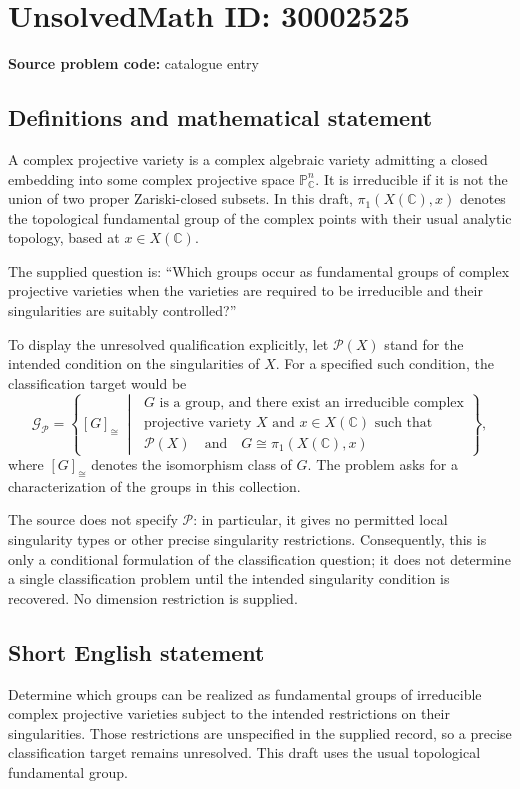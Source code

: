 \documentclass[11pt]{article}
\newcommand{\C}{\mathbb{C}}
\newcommand{\PP}{\mathbb{P}}
\begin{document}
\section*{UnsolvedMath ID: 30002525}
\textbf{Source problem code:} catalogue entry
\subsection{Definitions and mathematical statement}
A complex projective variety is a complex algebraic variety admitting a closed embedding into some complex projective space $\PP^n_{\C}$. It is irreducible if it is not the union of two proper Zariski-closed subsets. In this draft, $\pi_1(X(\C),x)$ denotes the topological fundamental group of the complex points with their usual analytic topology, based at $x\in X(\C)$.

The supplied question is: ``Which groups occur as fundamental groups of complex projective varieties when the varieties are required to be irreducible and their singularities are suitably controlled?''

To display the unresolved qualification explicitly, let $\mathcal P(X)$ stand for the intended condition on the singularities of $X$. For a specified such condition, the classification target would be
\[
\mathcal G_{\mathcal P}
=
\left\{[G]_{\cong}\;\middle|\;
\begin{gathered}
G\text{ is a group, and there exist an irreducible complex}\\
\text{projective variety }X\text{ and }x\in X(\C)\text{ such that}\\
\mathcal P(X)\quad\text{and}\quad G\cong\pi_1(X(\C),x)
\end{gathered}
\right\},
\]
where $[G]_{\cong}$ denotes the isomorphism class of $G$. The problem asks for a characterization of the groups in this collection.

The source does not specify $\mathcal P$: in particular, it gives no permitted local singularity types or other precise singularity restrictions. Consequently, this is only a conditional formulation of the classification question; it does not determine a single classification problem until the intended singularity condition is recovered. No dimension restriction is supplied.
\subsection{Short English statement}
Determine which groups can be realized as fundamental groups of irreducible complex projective varieties subject to the intended restrictions on their singularities. Those restrictions are unspecified in the supplied record, so a precise classification target remains unresolved. This draft uses the usual topological fundamental group.
\end{document}
